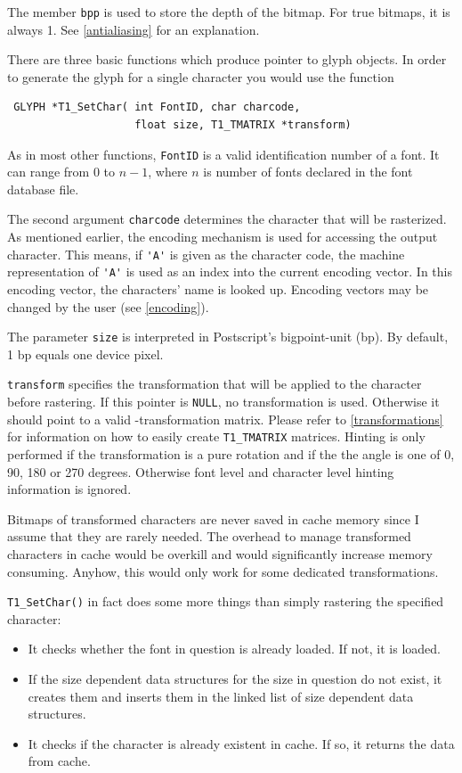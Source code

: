 The member \verb+bpp+ is used to store the depth of the bitmap. For
true bitmaps, it is always 1. See \ref{antialiasing} for an
explanation. 

There are three basic functions which produce pointer to glyph objects. In
order to generate the glyph for a single character you would use the
function 
\precorr 
\begin{verbatim}
 GLYPH *T1_SetChar( int FontID, char charcode, 
                    float size, T1_TMATRIX *transform)
\end{verbatim}\postcorr
As in most other functions, \verb+FontID+ is a valid identification
number of a font. It can range from 0 to $n-1$, where $n$ is number of
fonts declared in the font database file.

The second argument \verb+charcode+ determines the character that will
be rasterized.
As mentioned earlier, the encoding mechanism is used for
accessing the output character. This means, if \verb+'A'+ is given as
the character code, the machine representation of \verb+'A'+ is used
as an index into the current encoding vector. In this encoding vector,
the characters' name is looked up. Encoding vectors may be changed by
the user (see \ref{encoding}).


The parameter \verb+size+ is interpreted in Postscript's bigpoint-unit
(bp). By default, 
1 bp equals one device pixel. 

\verb+transform+ specifies the transformation that will be applied to the
character before rastering. If this pointer is \verb+NULL+, no transformation
is used. Otherwise it should point to a valid \tonelib-transformation matrix.
Please refer to \ref{transformations} for information on how to easily create
\verb+T1_TMATRIX+ matrices.
Hinting is only performed if the transformation is a pure rotation and if the
the angle is one of 0, 90, 180 or 270 degrees. Otherwise font level and
character level hinting information is ignored.

Bitmaps of transformed characters are never saved in
cache memory since I assume that they are rarely needed. The overhead
to manage transformed characters in cache would be overkill and would
significantly increase memory consuming. Anyhow, this would only work
for some dedicated transformations.

\verb+T1_SetChar()+ in fact does some more things than simply
rastering the specified character:
\begin{itemize}
\item It checks whether the font in question is already loaded. If not,
  it is loaded. 
\item If the size dependent data structures for the size in question
  do not exist, it creates them and inserts them in the linked list of
  size dependent data structures.
\item It checks if the character is already existent in cache. If so,
  it returns the data from cache.
\end{itemize}

